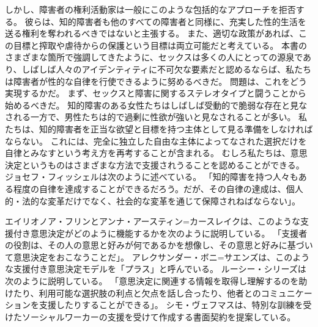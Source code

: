 \documentclass[paper=a4,book,openany]{jlreq}
\begin{document}
しかし、障害者の権利活動家は一般にこのような包括的なアプローチを拒否する。
彼らは、知的障害者も他のすべての障害者と同様に、充実した性的生活を送る権利を奪われるべきではないと主張する。
また、適切な政策があれば、この目標と搾取や虐待からの保護という目標は両立可能だと考えている。
本書のさまざまな箇所で強調してきたように、セックスは多くの人にとっての源泉であり、しばしば人々のアイデンティティに不可欠な要素だと認めるならば、私たちは障害者が性的な自律を行使できるように努めるべきだ\citep{vehmas19:_person_profoun_intel_disab_their_right_sex,hollomotz10:_vulner_adult,evans09:_sexual_person_relat_peopl_intel_disab,kittay10:_person_is_philos_is_polit}。
問題は、これをどう実現するかだ。
まず、セックスと障害に関するステレオタイプと闘うことから始めるべきだ。
知的障害のある女性たちはしばしば受動的で脆弱な存在と見なされる一方で、男性たちは的で過剰に性欲が強いと見なされることが多い\citep{feely16:_sexual_surveil_contr_commun_based,gill15:_alread_doing_it,barrett14:_disab_mascul}。
私たちは、知的障害者を正当な欲望と目標を持つ主体として見る準備をしなければならない。
これには、完全に独立した自由な主体によってなされた選択だけを自律とみなすという考え方を再考することが含まれる。
むしろ私たちは、意思決定というものはさまざまな方法で支援されうることを認めることができる。
ジョセフ・フィッシェルは次のように述べている。
「知的障害を持つ人々もある程度の自律を達成することができるだろう。だが、その自律の達成は、個人的・法的な変革だけでなく、社会的な変革を通じて保障されねばならない」\citep[p.146]{fischel18:screwconsent}。

エイリオノア・フリンとアンナ・アースティン=カースレイクは、このような支援付き意思決定がどのように機能するかを次のように説明している。
「支援者の役割は、その人の意思と好みが何であるかを想像し、その意思と好みに基づいて意思決定をおこなうことだ」\citep[pp.81--104]{flynn14:_legis_person}。
アレクサンダー・ボニ=サエンズは、このような支援付き意思決定モデルを「プラス」と呼んでいる\citep[p.1234]{boni-saenz15:_sexual_incap}。
ルーシー・シリーズは次のように説明している。
「意思決定に関連する情報を取得し理解するのを助けたり、利用可能な選択肢の利点と欠点を話し合ったり、他者とのコミュニケーションを支援したりすることができる」\citep{series15:_relat_auton_legal_capac}。
シモ・ヴェフマスは、特別な訓練を受けたソーシャルワーカーの支援を受けて作成する書面契約を提案している\citep[p.527]{vehmas19:_person_profoun_intel_disab_their_right_sex}。
\end{document}
